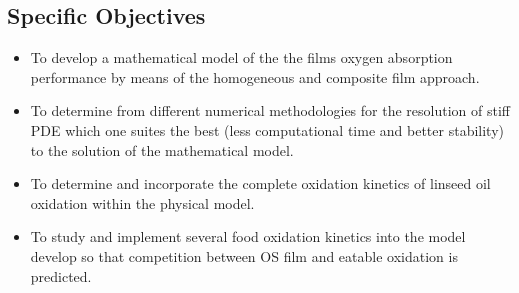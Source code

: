 \begin{refsection}
\subsection{Specific Objectives}
\begin{itemize}
    \item To develop a mathematical model of the the films oxygen absorption performance by means of the homogeneous and composite film approach.
    \item To determine from different numerical methodologies for the resolution of stiff PDE which one suites the best (less computational time and better stability) to the solution of the mathematical model. 
    \item To determine and incorporate the complete oxidation kinetics of linseed oil oxidation within the physical model. 
    \item To study and implement several food oxidation kinetics into the model develop so that competition between OS film and eatable oxidation is predicted.
\end{itemize}
\vspace{\fill}



\printbibliography
\end{refsection}